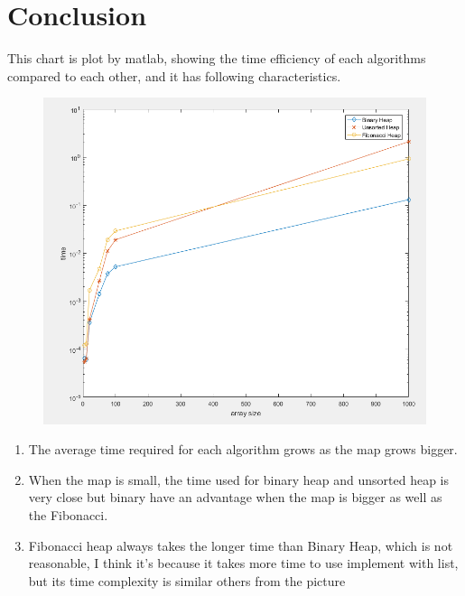 \documentclass[12pt]{article}
\begin{document}
\section{Conclusion}
This chart is plot by matlab, showing the time efficiency of each algorithms compared to each other, and it has following characteristics.
\begin{figure}[H]
\centering
\includegraphics[scale=0.5]{P3.png}
\end{figure}
\begin{enumerate}
\item The average time required for each algorithm grows as the map grows bigger.
\item When the map is small, the time used for binary heap and unsorted heap is very close but binary have an advantage when the map is bigger as well as the Fibonacci.
\item Fibonacci heap always takes the longer time than Binary Heap, which is not reasonable, I think it's because it takes more time to use implement with list, but its time complexity is similar others from the picture
\end{enumerate}
\end{document}
